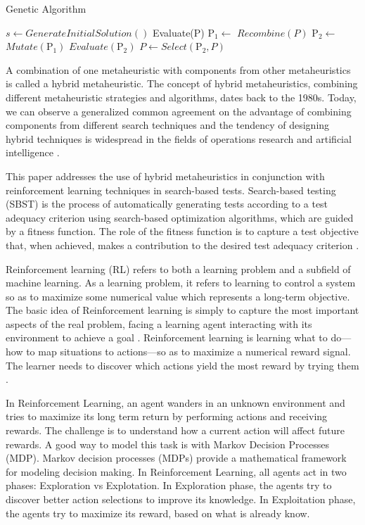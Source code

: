\documentclass{bmcart}
\begin{document}
\begin{algorithm}[h]
  \caption{Genetic Algorithm}\label{gna}
  \begin{algorithmic}[1]
    
    \State $s\gets GenerateInitialSolution()$
    \State Evaluate(P)
    \State $\mbox{P}_1\gets$ $Recombine(P)$
    \State $\mbox{P}_2\gets$ $Mutate(\mbox{P}_1)$ 
    \State $Evaluate(\mbox{P}_2)$
    \State $P\gets Select(\mbox{P}_2,P)$
    \EndWhile
      
  \end{algorithmic}
\end{algorithm}

A combination of one metaheuristic with components from other metaheuristics is called a hybrid metaheuristic. The concept of hybrid metaheuristics, combining different metaheuristic strategies and algorithms, dates back to the 1980s. Today, we can observe a generalized common agreement on the advantage of combining components from different search techniques and the tendency of designing hybrid techniques is widespread in the fields of operations research and artificial intelligence \citep{raidl2010metaheuristic}. 


This paper addresses the use of hybrid metaheuristics in conjunction with reinforcement learning techniques in search-based tests. Search-based testing (SBST) is the process of automatically generating tests according to a test adequacy criterion using search-based optimization algorithms, which are guided by a fitness function. The role of the fitness function is to capture a test objective that, when achieved, makes a contribution to the desired test adequacy criterion \citep{Harman2010}.

Reinforcement learning (RL) refers to both a learning problem and a subfield of machine learning. As a learning problem, it refers to learning to control a system so as to maximize some numerical value which represents a long-term objective. The basic idea of Reinforcement learning  is simply to capture the most important aspects of the real problem, facing a learning agent interacting with its environment to achieve a goal \citep{Sutton2012}. Reinforcement learning is learning what to do—how to map situations to actions—so as to maximize a numerical reward signal. The learner needs to discover which actions yield the most reward by trying them \citep{Sutton2012}.

In Reinforcement Learning, an agent wanders in an unknown environment and tries to maximize its long term return by performing actions and receiving rewards. The challenge is to understand how a current action will affect future rewards. A good way to model this task is with Markov Decision Processes (MDP). Markov decision processes (MDPs) provide a mathematical framework for modeling decision making. In Reinforcement Learning, all agents act in two phases: Exploration vs Explotation. In Exploration phase, the agents try to discover better action selections to improve its knowledge. In Exploitation phase, the agents try to maximize its reward, based on what is already know.
\end{document}
